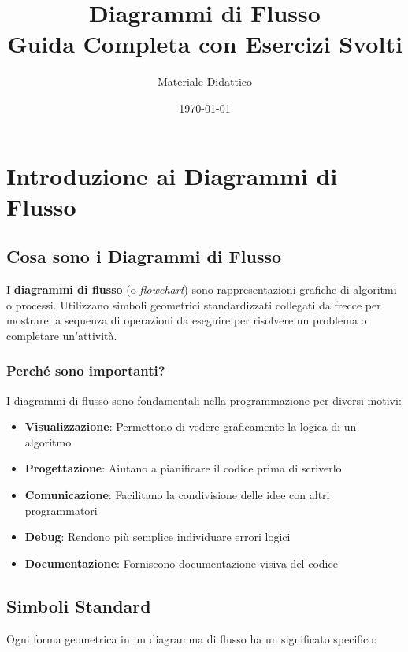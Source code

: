 \documentclass[a4paper,16pt]{article}
\title{\textbf{Diagrammi di Flusso}\\[0.3cm]\large Guida Completa con Esercizi Svolti}
\author{Materiale Didattico}
\date{\today}
\begin{document}
\maketitle
\tableofcontents
\newpage

\section{Introduzione ai Diagrammi di Flusso}

\subsection{Cosa sono i Diagrammi di Flusso}

I \textbf{diagrammi di flusso} (o \textit{flowchart}) sono rappresentazioni grafiche di algoritmi o processi. Utilizzano simboli geometrici standardizzati collegati da frecce per mostrare la sequenza di operazioni da eseguire per risolvere un problema o completare un'attività.

\subsubsection{Perché sono importanti?}

I diagrammi di flusso sono fondamentali nella programmazione per diversi motivi:

\begin{itemize}[leftmargin=*]
    \item \textbf{Visualizzazione}: Permettono di vedere graficamente la logica di un algoritmo
    \item \textbf{Progettazione}: Aiutano a pianificare il codice prima di scriverlo
    \item \textbf{Comunicazione}: Facilitano la condivisione delle idee con altri programmatori
    \item \textbf{Debug}: Rendono più semplice individuare errori logici
    \item \textbf{Documentazione}: Forniscono documentazione visiva del codice
\end{itemize}

\subsection{Simboli Standard}

Ogni forma geometrica in un diagramma di flusso ha un significato specifico:
\end{document}
